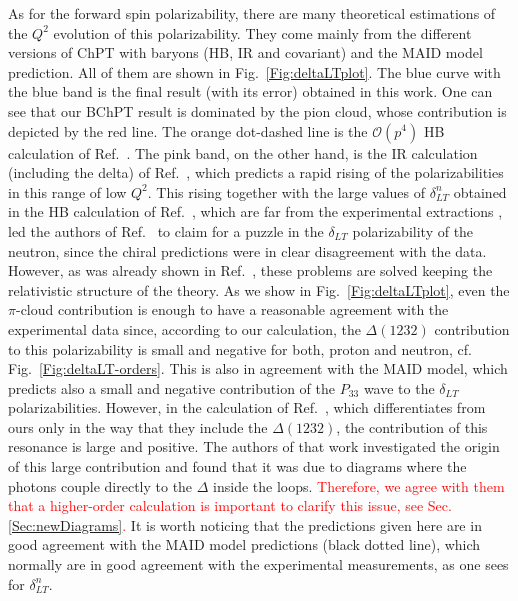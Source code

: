 \documentclass[twocolumn,prc,showpacs,nofootinbib,preprintnumbers,amsmath,amssymb,superscriptaddress]{revtex4-1}
\begin{document}
As for the forward spin polarizability, there are many theoretical estimations of the $Q^2$ evolution of this polarizability.
They come mainly from the different versions of ChPT with baryons (HB, IR and covariant) and the MAID model prediction.
All of them are shown in Fig.~\ref{Fig:deltaLTplot}.
The blue curve with the blue band is the final result (with its error) obtained in this work.
One can see that our BChPT result is dominated by the pion cloud, whose contribution is depicted by the red line.
The orange dot-dashed line is the  $\mathcal{O}(p^4)$ HB calculation of Ref.~\cite{Kao:2002cp}. 
The pink band, on the other hand, is the IR calculation (including the delta) of Ref.~\cite{Bernard:2002pw}, which predicts a rapid rising of the polarizabilities in this range of low $Q^2$. 
This rising together with the large values of $\delta_{LT}^n$ obtained in the HB calculation of Ref.~\cite{Kao:2002cp}, which are far from the experimental extractions \cite{Amarian:2004yf}, led the authors of Ref.~\cite{Kochelev:2011bh} to claim for a puzzle in the $\delta_{LT}$ polarizability of the neutron, since the chiral predictions were in clear disagreement with the data.
However, as was already shown in Ref.~\cite{Bernard:2012hb}, these problems are solved keeping the relativistic structure of the theory.
As we show in Fig.~\ref{Fig:deltaLTplot}, even the $\pi$-cloud contribution is enough to have a reasonable agreement with the experimental data since, according to our calculation, the $\Delta(1232)$ contribution to this polarizability is small and negative for both, proton and neutron, cf. Fig.~\ref{Fig:deltaLT-orders}. 
This is also in agreement with the MAID model, which predicts also a small and negative contribution of the $P_{33}$ wave to the $\delta_{LT}$ polarizabilities.
However, in the calculation of Ref.~\cite{Bernard:2012hb}, which differentiates from ours only in the way that they include the $\Delta(1232)$, the contribution of this resonance is large and positive.
The authors of that work investigated the origin of this large contribution and found that it was due to diagrams where the photons couple directly to the $\Delta$ inside the loops. 
\textcolor{red}{Therefore, we agree with them that a higher-order calculation is important to clarify this issue, see Sec. \ref{Sec:newDiagrams}.}
It is worth noticing that the predictions given here are in good agreement with the MAID model predictions (black dotted line), which normally are in good agreement with the experimental measurements, as one sees for $\delta_{LT}^n$.
\end{document}
